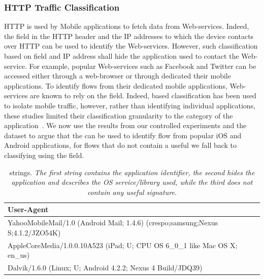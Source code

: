 \subsubsection{HTTP Traffic Classification}

HTTP is used by Mobile applications to fetch data from Web-services.
Indeed, the \httphost field in the HTTP header and the IP addresses to which the device contacts over HTTP can be used to identify the Web-services. 
However, such classification based on \httphost field and IP address shall hide the application used to contact the Web-service. 
For example, popular Web-services such as Facebook and Twitter can be accessed either through a web-browser or through dedicated their mobile applications. 
To identify flows from their dedicated mobile applications, Web-services are known to rely on the \useragent field.
Indeed, \useragent based classification has been used to isolate mobile traffic, however, rather than identifying individual applications, these studies limited their classification granularity to the category of the application~\cite{erman2011http,xu:appusage,maier:mobtraffic}.
We now use the results from our controlled experiments and the \mobWild dataset to argue that the \useragent can be used to identify flow from popular iOS and Android applications, for flows that do not contain a useful \useragent we fall back to classifying using the \httphost field.


\begin{table}
\begin{small}
\begin{tabular}{|p{}|}
\hline
{\bf User-Agent}\tabularnewline
\hline
YahooMobileMail/1.0 (Android Mail; 1.4.6) (crespo;samsung;Nexus S;4.1.2/JZO54K)\tabularnewline
\hline
AppleCoreMedia/1.0.0.10A523 (iPad; U; CPU OS 6\_0\_1 like Mac OS X; en\_us) \tabularnewline
\hline
Dalvik/1.6.0 (Linux; U; Android 4.2.2; Nexus 4 Build/JDQ39) \tabularnewline
\hline
\end{tabular}
\end{small}
\caption{\useragent strings. \emph{The first string contains the application identifier, the second hides the application and describes the OS service/library used, while the third does not contain any useful signature.}}
\label{tab:user-agent}
\end{table}


